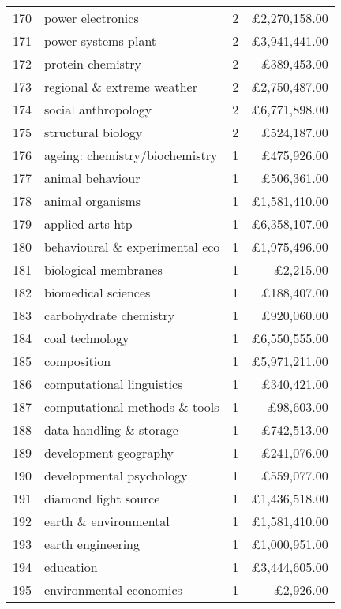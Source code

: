 \begin{spacing}{0.9}
\begin{longtable}[c]{r|>{\raggedleft\arraybackslash}m{6.5cm}|>{\raggedleft\arraybackslash}m{1.9cm}|r}
{170} & {power electronics} & {2} & {\pounds2,270,158.00}\\
{171} & {power systems plant} & {2} & {\pounds3,941,441.00}\\
{172} & {protein chemistry} & {2} & {\pounds389,453.00}\\
{173} & {regional \& extreme weather} & {2} & {\pounds2,750,487.00}\\
{174} & {social anthropology} & {2} & {\pounds6,771,898.00}\\
{175} & {structural biology} & {2} & {\pounds524,187.00}\\
{176} & {ageing: chemistry/biochemistry} & {1} & {\pounds475,926.00}\\
{177} & {animal behaviour} & {1} & {\pounds506,361.00}\\
{178} & {animal organisms} & {1} & {\pounds1,581,410.00}\\
{179} & {applied arts htp} & {1} & {\pounds6,358,107.00}\\
{180} & {behavioural \& experimental eco} & {1} & {\pounds1,975,496.00}\\
{181} & {biological membranes} & {1} & {\pounds2,215.00}\\
{182} & {biomedical sciences} & {1} & {\pounds188,407.00}\\
{183} & {carbohydrate chemistry} & {1} & {\pounds920,060.00}\\
{184} & {coal technology} & {1} & {\pounds6,550,555.00}\\
{185} & {composition} & {1} & {\pounds5,971,211.00}\\
{186} & {computational linguistics} & {1} & {\pounds340,421.00}\\
{187} & {computational methods \& tools} & {1} & {\pounds98,603.00}\\
{188} & {data handling \& storage} & {1} & {\pounds742,513.00}\\
{189} & {development geography} & {1} & {\pounds241,076.00}\\
{190} & {developmental psychology} & {1} & {\pounds559,077.00}\\
{191} & {diamond light source} & {1} & {\pounds1,436,518.00}\\
{192} & {earth \& environmental} & {1} & {\pounds1,581,410.00}\\
{193} & {earth engineering} & {1} & {\pounds1,000,951.00}\\
{194} & {education} & {1} & {\pounds3,444,605.00}\\
{195} & {environmental economics} & {1} & {\pounds2,926.00}\\

\end{longtable}
\end{spacing}
